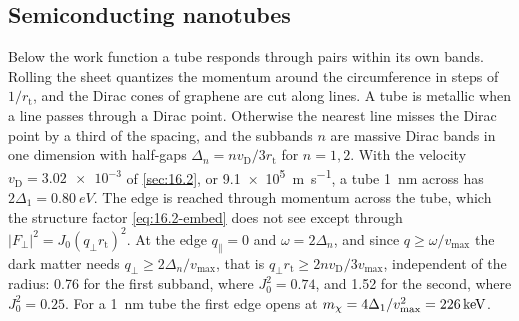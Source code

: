 \subsection{Semiconducting nanotubes}\label{sec:16.3-tubes}

Below the work function a tube responds through pairs within its own bands. Rolling the sheet quantizes the momentum around the circumference in steps of $1/r_{\mathrm{t}}$, and the Dirac cones of graphene are cut along lines. A tube is metallic when a line passes through a Dirac point. Otherwise the nearest line misses the Dirac point by a third of the spacing, and the subbands $n$ are massive Dirac bands in one dimension with half-gaps $\Delta_n = nv_{\mathrm{D}}/3r_{\mathrm{t}}$ for $n = 1, 2$. With the velocity $v_{\mathrm{D}} = \num{3.02e-3}$ of \cref{sec:16.2}, or \SI{9.1e5}{m.s^{-1}}, a tube \SI{1}{nm} across has $2\Delta_1 = \SI{0.80}{eV}$. The edge is reached through momentum across the tube, which the structure factor \cref{eq:16.2-embed} does not see except through $|F_\perp|^2 = J_0(q_\perp r_{\mathrm{t}})^2$. At the edge $q_\parallel = 0$ and $\omega = 2\Delta_n$, and since $q \ge \omega/v_{\mathrm{max}}$ the dark matter needs $q_\perp \ge 2\Delta_n/v_{\mathrm{max}}$, that is $q_\perp r_{\mathrm{t}} \ge 2nv_{\mathrm{D}}/3v_{\mathrm{max}}$, independent of the radius: 0.76 for the first subband, where $J_0^2 = 0.74$, and 1.52 for the second, where $J_0^2 = 0.25$. For a \SI{1}{nm} tube the first edge opens at $m_{\chi} = 4\Delta_1/v_{\mathrm{max}}^2 = \SI{226}{keV}$.

